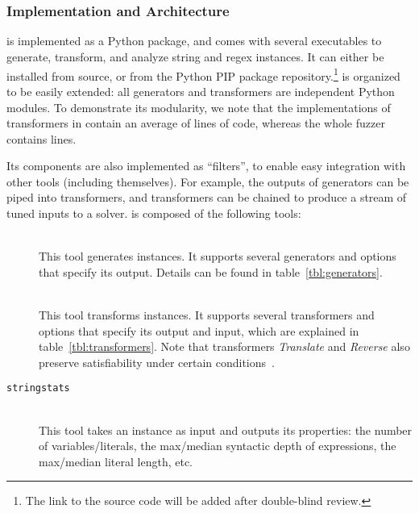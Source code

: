 \section{\fuzzer{}}
\label{sec:fuzzer}

\subsubsection{Implementation and Architecture}

\fuzzer{} is implemented as a Python package, and comes with several
executables to generate, transform, and analyze \smtfull{} string and regex
instances. It can either be installed from source, or from the Python
PIP package repository.\footnote{The link to the
source code will be added after double-blind review.}
\fuzzer{} is organized to be easily extended:
all generators and transformers are independent Python modules. To demonstrate
its modularity, we note that the implementations of transformers in \fuzzer{}
contain an average of \linesPerX{} lines of code, whereas the whole fuzzer
contains \linesInFuzzer{} lines.

Its components are also implemented as \unix{} ``filters'', to enable easy
integration with other tools (including themselves). For example, the
outputs of generators can be piped into transformers, and transformers
can be chained to produce a stream of tuned inputs to a
solver. \fuzzer{} is composed of the following tools:
\begin{description}
    \item[\generator{}] \hfill \\
        This tool generates \smt{} instances. It supports several generators and
        options that specify its output. Details can be found in
        table~\ref{tbl:generators}.
    \item[\transformer{}] \hfill \\
        This tool transforms \smt{}
        instances. It supports several transformers and options that specify
        its output and input, which are explained in
        table~\ref{tbl:transformers}. Note that transformers
        \textit{Translate} and \textit{Reverse} also preserve
        satisfiability under certain conditions~\cite{ifaz}.
    \item[\texttt{stringstats}] \hfill \\
        This tool takes an \smt{}
        instance as input and outputs its properties: the number of
        variables/literals, the max/median syntactic depth of expressions, the
        max/median literal length, etc.
\end{description}

